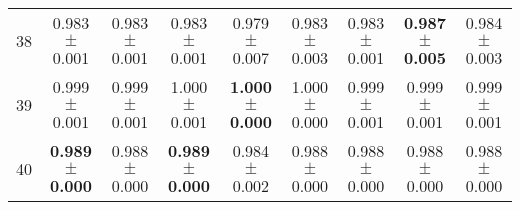 \begin{table}[!ht]
{\begin{tabular}{r c c c c c c c c}
38 & 0.983 $\pm$ 0.001 & 0.983 $\pm$ 0.001 & 0.983 $\pm$ 0.001 & 0.979 $\pm$ 0.007 & 0.983 $\pm$ 0.003 & 0.983 $\pm$ 0.001 & \textbf{0.987 $\pm$ 0.005} & 0.984 $\pm$ 0.003 \\
39 & 0.999 $\pm$ 0.001 & 0.999 $\pm$ 0.001 & 1.000 $\pm$ 0.001 & \textbf{1.000 $\pm$ 0.000} & 1.000 $\pm$ 0.000 & 0.999 $\pm$ 0.001 & 0.999 $\pm$ 0.001 & 0.999 $\pm$ 0.001 \\
40 & \textbf{0.989 $\pm$ 0.000} & 0.988 $\pm$ 0.000 & \textbf{0.989 $\pm$ 0.000} & 0.984 $\pm$ 0.002 & 0.988 $\pm$ 0.000 & 0.988 $\pm$ 0.000 & 0.988 $\pm$ 0.000 & 0.988 $\pm$ 0.000 \\
\end{tabular}}
\end{table}
